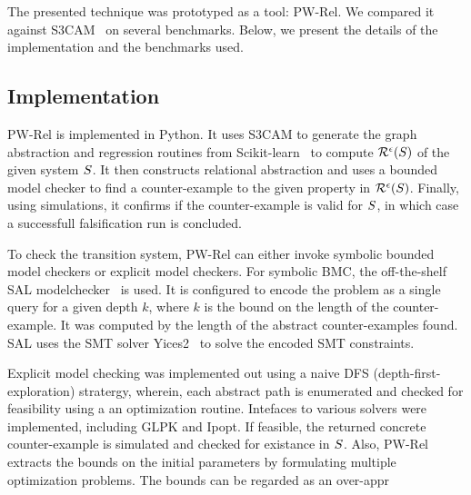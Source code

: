 The presented technique was prototyped as a tool: PW-Rel.  We
compared it against S3CAM~\cite{zutshi2014multiple} on several
benchmarks. Below, we present the details of the implementation and
the benchmarks used.

\subsection{Implementation}

PW-Rel is implemented in Python. It uses S3CAM to generate the graph
abstraction and regression routines from
Scikit-learn~\cite{pedregosa2011scikit} to compute
$\mathcal{R}^{\epsilon}(S)$ of the given system $S$.
It then constructs relational abstraction and uses a bounded model
checker to find a counter-example to the given property in
$\mathcal{R}^{\epsilon}(S)$. Finally, using simulations, it
confirms if the counter-example is valid for $S$, in which case
a successfull falsification run is concluded.

To check the transition system, PW-Rel can either invoke symbolic
bounded model checkers or explicit model checkers. For symbolic BMC,
the off-the-shelf SAL modelchecker~\cite{SAL-SRI} is used. It is
configured to encode the problem as a single query for a given depth
$k$, where $k$ is the bound on the length of the counter-example. It
was computed by the length of the abstract counter-examples found. SAL
uses the SMT solver Yices2~\cite{dutertre2014yices} to solve the
encoded SMT constraints.


Explicit model checking was implemented out using a naive DFS
(depth-first-exploration) stratergy, wherein, each abstract path is
enumerated and checked for feasibility using a an optimization
routine. Intefaces to various solvers were implemented, including GLPK
and Ipopt. If feasible, the returned concrete counter-example is
simulated and checked for existance in $S$. Also, PW-Rel
extracts the bounds on the initial parameters by formulating multiple
optimization problems. The bounds can be regarded as an over-appr

